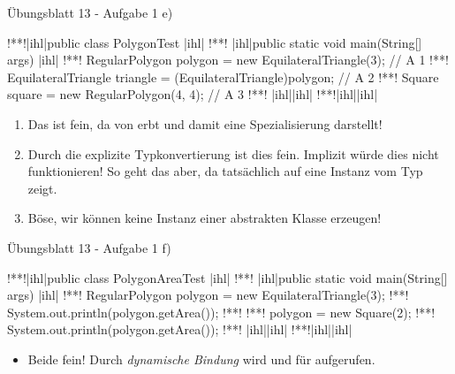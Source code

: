 \begin{frame}[c,fragile]{Übungsblatt 13 - Aufgabe 1 e)}
\SetupLstHl\begin{plainjava}[morekeywords={[3]{PolygonTest,RegularPolygon,EquilateralTriangle,Square}}]
!**!|ihl|public class PolygonTest {|ihl|
!**!   |ihl|public static void main(String[] args) {|ihl|
!**!      RegularPolygon polygon = new EquilateralTriangle(3); // A 1
!**!      EquilateralTriangle triangle = (EquilateralTriangle)polygon; // A 2
!**!      Square square = new RegularPolygon(4, 4); // A 3
!**!   |ihl|}|ihl|
!**!|ihl|}|ihl|
\end{plainjava}
\begin{enumerate}
    \item<3-> Das ist fein, da  von  erbt und damit eine Spezialisierung darstellt! 
    \item<4-> Durch die explizite Typkonvertierung ist dies fein. Implizit würde dies nicht funktionieren! So geht das aber, da  tatsächlich auf eine Instanz vom Typ  zeigt.
    \item<5-> Böse, wir können keine Instanz einer abstrakten Klasse erzeugen!
\end{enumerate}
\end{frame}


\begin{frame}[c,fragile]{Übungsblatt 13 - Aufgabe 1 f)}
\SetupLstHl\begin{plainjava}[morekeywords={[3]{PolygonTest,RegularPolygon,EquilateralTriangle,PolygonAreaTest,Square}}]
!**!|ihl|public class PolygonAreaTest {|ihl|
!**!    |ihl|public static void main(String[] args) {|ihl|
!**!        RegularPolygon polygon = new EquilateralTriangle(3);
!**!        System.out.println(polygon.getArea());
!**!
!**!        polygon = new Square(2);
!**!        System.out.println(polygon.getArea());
!**!    |ihl|}|ihl|
!**!|ihl|}|ihl|
\end{plainjava}
\begin{itemize}
    \item<3-> Beide fein! Durch \textit{dynamische Bindung} wird  und  für  aufgerufen. 
\end{itemize}
\end{frame}

